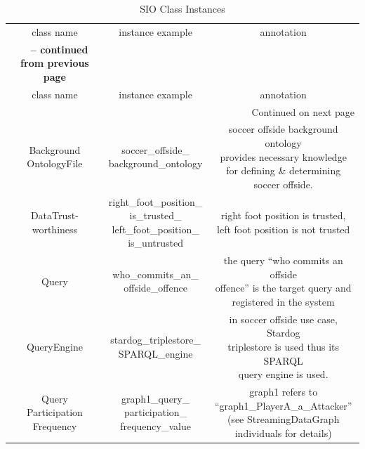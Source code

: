 \begin{center}
\begin{longtable}{|c||c||c|}
	\caption{SIO Class Instances} \label{tab:app-gi} \\
	\hline \multicolumn{1}{|c||}{class name} & \multicolumn{1}{c||}{instance example} & \multicolumn{1}{c|}{annotation} \\ \hhline{|=#=#=|}
	\endfirsthead
	\multicolumn{3}{c}%
	{{\bfseries \tablename\ \thetable{} -- continued from previous page}} \\
	\hline \multicolumn{1}{|c||}{class name} &
	\multicolumn{1}{c||}{instance example} &
	\multicolumn{1}{c|}{annotation} \\ \hline 
	\endhead
	\hline \multicolumn{3}{|r|}{{Continued on next page}} \\ \hline
	\endfoot
	\hline
	\endlastfoot
	\makecell{Background\\OntologyFile} & \makecell{soccer\_offside\_\\background\_ontology} & \makecell[l]{soccer offside background ontology \\ provides necessary knowledge \\ for defining \& determining \\soccer offside.} \\ \hline
	\makecell{DataTrust-\\worthiness} & \makecell{right\_foot\_position\_\\is\_trusted\_\\left\_foot\_position\_\\is\_untrusted} & \makecell[l]{right foot position is trusted, \\left foot position is not trusted} \\ \hline
	Query & \makecell{who\_commits\_an\_\\offside\_offence} & \makecell[l]{the query ``who commits an offside \\offence'' is the target query and \\registered in the system} \\ \hline
	QueryEngine & \makecell{stardog\_triplestore\_\\SPARQL\_engine} & \makecell[l]{in soccer offside use case, Stardog \\triplestore is used thus its SPARQL \\query engine is used.} \\ \hline
	\makecell{Query\\Participation\\Frequency} & \makecell{graph1\_query\_\\participation\_\\frequency\_value} & \makecell[l]{graph1 refers to\\``graph1\_PlayerA\_a\_Attacker''\\ (see StreamingDataGraph \\individuals for details)} \\ \hline

\end{longtable}
\end{center}
